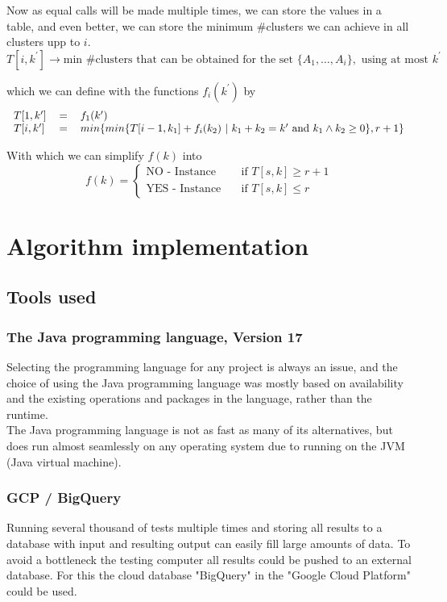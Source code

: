 \documentclass[a4paper]{article}
\begin{document}
Now as equal calls will be made multiple times, we can store the values in a table, and even better, we can store the minimum \#clusters we can achieve in all clusters upp to $i$.
\[ 
    T[i, k^\prime] \rightarrow \text{min \#clusters that can be obtained for the set } \{A_1, \dots, A_i\}, \text{ using at most } k^\prime
\]

which we can define with the functions $f_i(k^\prime)$ by
\[
    \begin{tabular}{lcl}
        $T[1, k^\prime]$ & $=$ & $f_1(k^\prime)$ \\
        $T[i, k^\prime]$ & $=$ & $min\{ min\{ T[ i-1, k_1 ] + f_i(k_2) ~|~ k_1 + k_2 = k^\prime \text{~and~} k_1 \wedge k_2 \geq 0\}, r+1 \}$
    \end{tabular}
\]

With which we can simplify $f(k)$ into
\[ f(k) =
  \begin{cases}
    \text{NO - Instance}   & \quad \text{if } T[s,k] \geq r+1 \\
    \text{YES - Instance}  & \quad \text{if } T[s,k] \leq r
  \end{cases}
\]


%
%
\newpage

\section{Algorithm implementation}
\label{sec:impl}
\subsection{Tools used}
\subsubsection{The Java programming language, Version 17}
Selecting the programming language for any project is always an issue, and the choice of using
the Java programming language was mostly based on availability and the existing operations
and packages in the language, rather than the runtime.
\\
The Java programming language is not as fast as many of its alternatives, but does run almost
seamlessly on any operating system due to running on the JVM (Java virtual machine).

\subsubsection{GCP / BigQuery}
\label{sec:bigquery}
Running several thousand of tests multiple times and storing all results to a database with
input and resulting output can easily fill large amounts of data. To avoid a bottleneck the
testing computer all results could be pushed to an external database. For this the cloud database
"BigQuery" in the "Google Cloud Platform" could be used.
\end{document}
